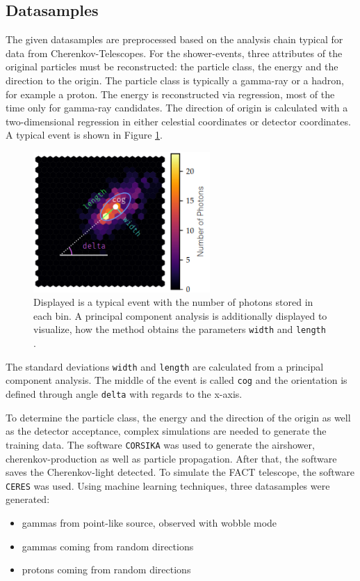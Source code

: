 \subsection{Datasamples}
The given datasamples are preprocessed based on the analysis chain typical for data from Cherenkov-Telescopes.
For the shower-events, three attributes of the original particles must be reconstructed: the particle class, the energy and the direction to the origin.
The particle class is typically a gamma-ray or a hadron, for example a proton. The energy is reconstructed via
regression, most of the time only for gamma-ray candidates. The direction of origin is calculated with a two-dimensional regression in
either celestial coordinates or detector coordinates.
A typical event is shown in Figure \ref{fig:event}.
\begin{figure}[H]
  \centering
  \includegraphics[width=0.6\textwidth]{fact_pics/event.png}
  \caption{Displayed is a typical event with the number of photons stored in each bin. A principal component analysis is additionally displayed to
  visualize, how the method obtains the parameters \texttt{width} and \texttt{length} \cite{ANLEITUNG}.}
  \label{fig:event}
\end{figure}
The standard deviations \texttt{width} and \texttt{length} are calculated from a principal component analysis.
The middle of the event is called \texttt{cog} and the orientation is defined through angle \texttt{delta} with regards to the x-axis.

To determine the particle class, the energy and the direction of the origin as well as the detector acceptance, complex simulations are needed to generate
the training data.
The software \texttt{CORSIKA} was used to generate the airshower, cherenkov-production as well as particle propagation. After that, the software
saves the Cherenkov-light detected.
To simulate the FACT telescope, the software \texttt{CERES} was used. Using machine learning techniques, three datasamples were generated:
\begin{itemize}
  \item gammas from point-like source, observed with wobble mode
  \item gammas coming from random directions
  \item protons coming from random directions
\end{itemize}

